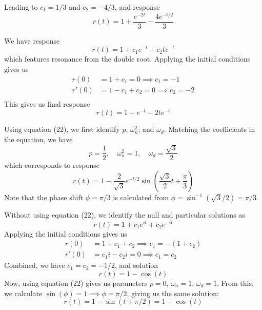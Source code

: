 \documentclass[a4paper]{article}
\begin{document}
Leading to \( c_{1} = 1/3 \) and \( c_{2} = -4/3 \), and response
\[
	r \!\left( t  \right) = 1 + \frac{e^{-2t }}{3} - \frac{4e^{-t/2}}{3}
\]


We have response
\[
	r \!\left( t  \right) = 1 + c_{1}e^{-t } + c_{2} te^{-t } 
\]
which features resonance from the double root. Applying the initial conditions gives us
\begin{align*}
	r \!\left( 0 \right) & = 1 + c_{1} = 0 \implies \boxed{c_{1} = -1} \\
	r'\!\left( 0 \right) & = 1 - c_{1} + c_{2} = 0 \implies \boxed{c_{2} = -2} \\ 
\end{align*}
This gives us final response
\[
	r \!\left( t  \right) = 1 -e^{-t } - 2te^{-t} 
\]


Using equation (22), we first identify \( p  \), \( \omega^{2}_{n } \), and \( \omega_{d } \). Matching the coefficients in the equation, we have
\[
	p = \frac{1}{2}, \quad \omega^{2}_{n } = 1, \quad \omega_{d } = \frac{\sqrt{3}}{2} 
\]
which corresponds to response
\[
	r \!\left( t  \right) = 1 - \frac{2}{\sqrt{3}}e^{-t/2} \sin\!\left( \frac{\sqrt{3}}{2} t + \frac{\pi }{3} \right)  
\]
Note that the phase shift \( \phi = \pi / 3 \) is calculated from \( \phi = \sin^{-1}\!\left( \sqrt{3}/2 \right) = \pi / 3 \).

\vspace{12pt}


Without using equation (22), we identify the null and particular solutions as 
\[
	r \!\left( t  \right) = 1 + c_{1}e^{it } + c_{2}e^{-it } 
\]
Applying the initial conditions gives us
\begin{align*}
	r \!\left( 0 \right) & = 1 + c_{1} + c_{2} \implies \boxed{c_{1} = -\!\left( 1  + c_{2} \right)} \\
	r'\!\left( 0 \right) & = c_{1}i - c_{2}i = 0 \implies \boxed{c_{1} = c_{2}}
\end{align*}
Combined, we have \( c_{1} = c_{2} = -1/2 \), and solution
\[
	r \!\left( t  \right) = 1 - \cos\!\left( t \right)  
\]
Now, using equation (22) gives us parameters \( p = 0 \), \( \omega_{n } = 1 \), \( \omega_{d } = 1 \). From this, we calculate \( \sin\!\left(\phi \right) = 1 \implies \phi = \pi / 2 \), giving us the same solution:
\[
	r \!\left( t  \right) = 1 - \sin\!\left(t + \pi / 2 \right) = 1 - \cos\!\left( t \right) 
\]
\end{document}
